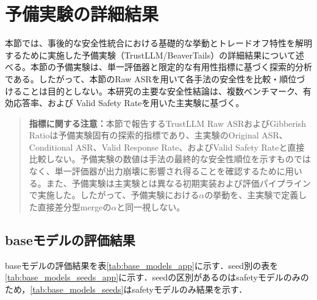 \documentclass{article}
\begin{document}
\section{予備実験の詳細結果}
\label{app:予備実験の詳細結果}
本節では、事後的な安全性統合における基礎的な挙動とトレードオフ特性を解明するために実施した予備実験（TrustLLM/BeaverTails）の詳細結果について述べる。本節の予備実験は、単一評価器と限定的な有用性指標に基づく探索的分析である。したがって、本節のRaw ASRを用いて各手法の安全性を比較・順位づけることは目的としない。本研究の主要な安全性結論は、複数ベンチマーク、有効応答率、および Valid Safety Rateを用いた主実験に基づく。

\begin{quote}
\textbf{指標に関する注意：}本節で報告するTrustLLM Raw ASRおよびGibberish Ratioは予備実験固有の探索的指標であり、主実験のOriginal ASR、Conditional ASR、Valid Response Rate、およびValid Safety Rateと直接比較しない。予備実験の数値は手法の最終的な安全性順位を示すものではなく、単一評価器が出力崩壊に影響され得ることを確認するために用いる。また、予備実験は主実験とは異なる初期実装および評価パイプラインで実施した。したがって、予備実験における\(\alpha\)の挙動を、主実験で定義した直接差分型mergeの\(\alpha\)と同一視しない。
\end{quote}


\subsection{baseモデルの評価結果}

baseモデルの評価結果を表\ref{tab:base_models_app}に示す．seed別の表を\ref{tab:base_models_seeds_app}に示す．seedの区別があるのはsafetyモデルのみのため，\ref{tab:base_models_seeds}はsafetyモデルのみ結果を示す．
\end{document}
